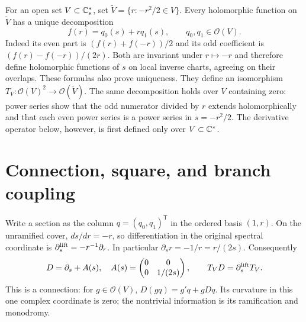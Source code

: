 For an open set $V\subset\mathbb C_s^*$, set
$\widetilde V=\{r:-r^2/2\in V\}$. Every holomorphic function on
$\widetilde V$ has a unique decomposition
\begin{equation}
f(r)=q_0(s)+r q_1(s),\qquad q_0,q_1\in\mathcal O(V).
\label{hc:even-odd}
\end{equation}
Indeed its even part is $(f(r)+f(-r))/2$ and its odd coefficient is
$(f(r)-f(-r))/(2r)$. Both are invariant under $r\mapsto-r$ and
therefore define holomorphic functions of $s$ on local inverse
charts, agreeing on their overlaps. These formulas also prove uniqueness.
They define an isomorphism $T_V:\mathcal O(V)^2\to\mathcal O(\widetilde V)$.
The same decomposition holds over $V$ containing zero: power series
show that the odd numerator divided by $r$ extends holomorphically
and that each even power series is a power series in $s=-r^2/2$.
The derivative operator below, however, is first defined only over
$V\subset\mathbb C^*$.

\section{Connection, square, and branch coupling}
Write a section as the column $q=(q_0,q_1)^{\mathsf T}$ in the
ordered basis $(1,r)$. On the unramified cover,
$ds/dr=-r$, so differentiation in the original spectral coordinate is
$\partial_s^{\rm lift}=-r^{-1}\partial_r$. In particular
$\partial_s r=-1/r=r/(2s)$. Consequently
\begin{equation}
D=\partial_s+A(s),\quad A(s)=\begin{pmatrix}0&0\\0&1/(2s)\end{pmatrix},
\qquad T_VD=\partial_s^{\rm lift}T_V.
\label{hc:D}
\end{equation}
This is a connection: for $g\in\mathcal O(V)$,
$D(gq)=g'q+gDq$. Its curvature in this one complex coordinate is zero;
the nontrivial information is its ramification and monodromy.

